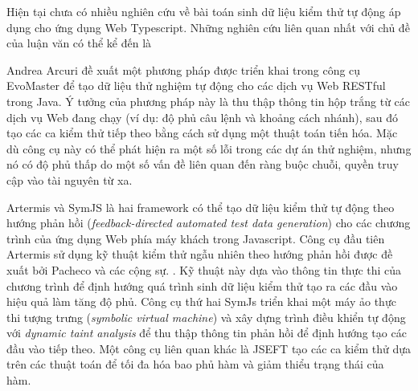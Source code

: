 Hiện tại chưa có nhiều nghiên cứu về bài toán sinh dữ liệu kiểm thử tự động áp dụng cho ứng dụng Web Typescript. Những nghiên cứu liên quan nhất với chủ đề của luận văn có thể kể đến là \cite{evomaster,artermis,symjs,js_based_statement_coverage, jseft}

Andrea Arcuri đề xuất một phương pháp được triển khai trong công cụ EvoMaster \cite{evomaster} để tạo dữ liệu thử nghiệm tự động cho các dịch vụ Web RESTful trong Java. Ý tưởng của phương pháp này là thu thập thông tin hộp trắng từ các dịch vụ Web đang chạy (ví dụ: độ phủ câu lệnh và khoảng cách nhánh), sau đó tạo các ca kiểm thử tiếp theo bằng cách sử dụng một thuật toán tiến hóa. Mặc dù công cụ này có thể phát hiện ra một số lỗi trong các dự án thử nghiệm, nhưng nó có độ phủ thấp do một số vấn đề liên quan đến ràng buộc chuỗi, quyền truy cập vào tài nguyên từ xa.

Artermis \cite {artermis} và SymJS \cite {symjs} là hai framework có thể tạo dữ liệu kiểm thử tự động theo hướng phản hồi (\textit{feedback-directed automated
test data generation}) cho các chương trình của ứng dụng Web phía máy khách trong Javascript. Công cụ đầu tiên Artermis sử dụng kỹ thuật kiểm thử ngẫu nhiên theo hướng phản hồi được đề xuất bởi Pacheco và các cộng sự. \cite{feedback_directed_random_testing}. Kỹ thuật này dựa vào thông tin thực thi của chương trình để định hướng quá trình sinh dữ liệu kiểm thử tạo ra các đầu vào hiệu quả làm tăng độ phủ. Công cụ thứ hai SymJs triển khai một máy ảo thực thi tượng trưng (\textit{symbolic virtual machine}) và xây dựng trình điều khiển tự động với \textit{dynamic taint analysis} \cite{taint_analysis_1, taint_analysis_2} để thu thập thông tin phản hồi để định hướng tạo các đầu vào tiếp theo. Một công cụ liên quan khác là JSEFT \cite{jseft} tạo các ca kiểm thử dựa trên các thuật toán để tối đa hóa bao phủ hàm và giảm thiểu trạng thái của hàm.


